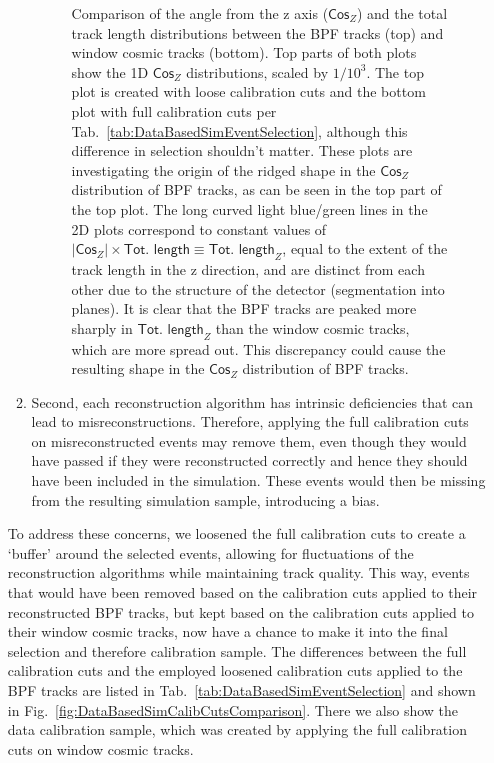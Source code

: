 \begin{enumerate}
\begin{enumerate}
\begin{figure}[!hbtp]
\caption[Comparison of the $\textsf{Cos}_Z$ and track length distributions between tracking algorithms for the data-based simulation selection]{Comparison of the angle from the z axis ($\textsf{Cos}_Z$) and the total track length distributions between the \acrshort{BPF} tracks (top) and window cosmic tracks (bottom). Top parts of both plots show the 1D $\textsf{Cos}_Z$ distributions, scaled by $1/10^3$. The top plot is created with loose calibration cuts and the bottom plot with full calibration cuts per Tab.~\ref{tab:DataBasedSimEventSelection}, although this difference in selection shouldn't matter. These plots are investigating the origin of the ridged shape in the $\textsf{Cos}_Z$ distribution of \acrshort{BPF} tracks, as can be seen in the top part of the top plot. The long curved light blue/green lines in the 2D plots correspond to constant values of $\left|\textsf{Cos}_Z\right|\times\textsf{Tot. length} \equiv \textsf{Tot. length}_Z$, equal to the extent of the track length in the z direction, and are distinct from each other due to the structure of the detector (segmentation into planes). It is clear that the \gls{BPF} tracks are peaked more sharply in $\textsf{Tot. length}_Z$ than the window cosmic tracks, which are more spread out. This discrepancy could cause the resulting shape in the $\textsf{Cos}_Z$ distribution of \acrshort{BPF} tracks.}
\label{fig:DataBasedSimBPFPeaks}
\end{figure}

\item Second, each reconstruction algorithm has intrinsic deficiencies that can lead to misreconstructions. Therefore, applying the full calibration cuts on misreconstructed events may remove them, even though they would have passed if they were reconstructed correctly and hence they should have been included in the simulation. These events would then be missing from the resulting simulation sample, introducing a bias.
\end{enumerate}

To address these concerns, we loosened the full calibration cuts to create a `buffer' around the selected events, allowing for fluctuations of the reconstruction algorithms while maintaining track quality. This way, events that would have been removed based on the calibration cuts applied to their reconstructed \gls{BPF} tracks, but kept based on the calibration cuts applied to their window cosmic tracks, now have a chance to make it into the final selection and therefore calibration sample. The differences between the full calibration cuts and the employed loosened calibration cuts applied to the \gls{BPF} tracks are listed in Tab.~\ref{tab:DataBasedSimEventSelection} and shown in Fig.~\ref{fig:DataBasedSimCalibCutsComparison}. There we also show the data calibration sample, which was created by applying the full calibration cuts on window cosmic tracks.
\end{enumerate}

